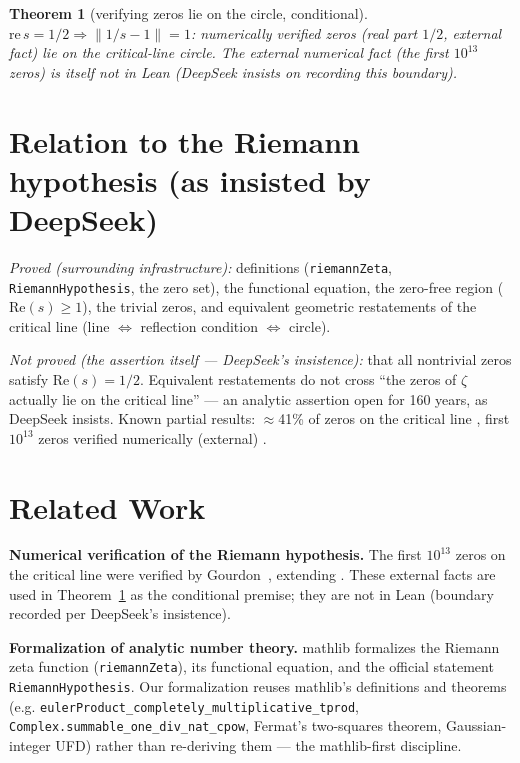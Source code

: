 \documentclass[11pt]{article}
\newtheorem{theorem}{Theorem}
\theoremstyle{remark}
\begin{document}
\begin{theorem}[verifying zeros lie on the circle, conditional]
\label{thm:verified}
$\mathrm{re}\,s=1/2 \Rightarrow \|1/s-1\|=1$: numerically verified zeros (real
part $1/2$, external fact) lie on the critical-line circle. The external
numerical fact (the first $10^{13}$ zeros) is itself not in Lean (DeepSeek
insists on recording this boundary).
\end{theorem}

\section{Relation to the Riemann hypothesis (as insisted by DeepSeek)}
\label{sec:rh}

\emph{Proved (surrounding infrastructure):} definitions (\texttt{riemannZeta},
\texttt{RiemannHypothesis}, the zero set), the functional equation, the
zero-free region ($\mathrm{Re}(s)\geq 1$), the trivial zeros, and equivalent
geometric restatements of the critical line (line $\iff$ reflection condition
$\iff$ circle).

\emph{Not proved (the assertion itself --- DeepSeek's insistence):} that all
nontrivial zeros satisfy $\mathrm{Re}(s)=1/2$. Equivalent restatements do not
cross ``the zeros of $\zeta$ actually lie on the critical line'' --- an
analytic assertion open for 160 years, as DeepSeek insists. Known partial
results: $\approx$41\% of zeros on the critical line
\cite{levinson1974,conrey1989}, first $10^{13}$ zeros verified numerically
(external) \cite{gourdon2004}.

\section{Related Work}
\label{sec:related}

\textbf{Numerical verification of the Riemann hypothesis.} The first $10^{13}$
zeros on the critical line were verified by Gourdon~\cite{gourdon2004},
extending \cite{vandulune1986}. These external facts are used in
Theorem~\ref{thm:verified} as the conditional premise; they are not in Lean
(boundary recorded per DeepSeek's insistence).

\textbf{Formalization of analytic number theory.} mathlib formalizes the
Riemann zeta function (\texttt{riemannZeta}), its functional equation, and
the official statement \texttt{RiemannHypothesis}. Our formalization reuses
mathlib's definitions and theorems (e.g.
\texttt{eulerProduct\_completely\_multiplicative\_tprod},
\texttt{Complex.summable\_one\_div\_nat\_cpow}, Fermat's two-squares theorem,
Gaussian-integer UFD) rather than re-deriving them --- the mathlib-first
discipline.
\end{document}
